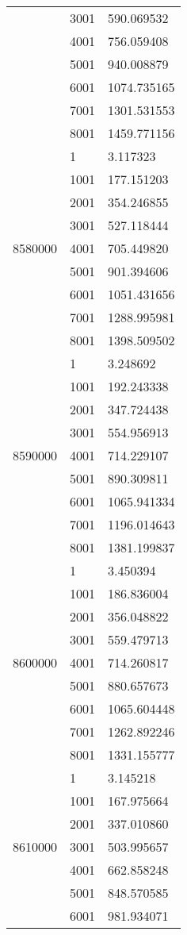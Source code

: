 \begin{table}[htb!]
\begin{tabular}{lll}
 & 3001 & 590.069532 \\
 & 4001 & 756.059408 \\
 & 5001 & 940.008879 \\
 & 6001 & 1074.735165 \\
 & 7001 & 1301.531553 \\
 & 8001 & 1459.771156 \\
\multirow[c]{9}{*}{8580000} & 1 & 3.117323 \\
 & 1001 & 177.151203 \\
 & 2001 & 354.246855 \\
 & 3001 & 527.118444 \\
 & 4001 & 705.449820 \\
 & 5001 & 901.394606 \\
 & 6001 & 1051.431656 \\
 & 7001 & 1288.995981 \\
 & 8001 & 1398.509502 \\
\multirow[c]{9}{*}{8590000} & 1 & 3.248692 \\
 & 1001 & 192.243338 \\
 & 2001 & 347.724438 \\
 & 3001 & 554.956913 \\
 & 4001 & 714.229107 \\
 & 5001 & 890.309811 \\
 & 6001 & 1065.941334 \\
 & 7001 & 1196.014643 \\
 & 8001 & 1381.199837 \\
\multirow[c]{9}{*}{8600000} & 1 & 3.450394 \\
 & 1001 & 186.836004 \\
 & 2001 & 356.048822 \\
 & 3001 & 559.479713 \\
 & 4001 & 714.260817 \\
 & 5001 & 880.657673 \\
 & 6001 & 1065.604448 \\
 & 7001 & 1262.892246 \\
 & 8001 & 1331.155777 \\
\multirow[c]{9}{*}{8610000} & 1 & 3.145218 \\
 & 1001 & 167.975664 \\
 & 2001 & 337.010860 \\
 & 3001 & 503.995657 \\
 & 4001 & 662.858248 \\
 & 5001 & 848.570585 \\
 & 6001 & 981.934071 \\

\end{tabular}
\end{table}
